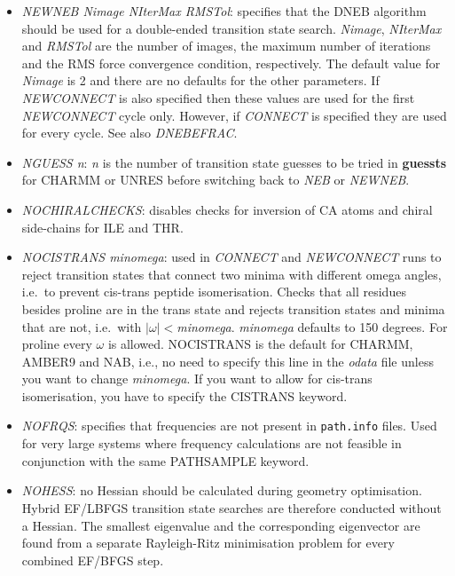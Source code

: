 \documentclass[12pt,a4paper,dvips]{article}
\begin{document}
\begin{itemize}
\item {\it NEWNEB Nimage NIterMax RMSTol\/}:
specifies that the DNEB algorithm\cite{TrygubenkoW04} 
should be used for a double-ended transition state search.
{\it Nimage\/}, {\it NIterMax\/} and {\it RMSTol} are the number of images, the maximum
number of iterations and the RMS force convergence condition, respectively. 
The default value for {\it Nimage\/} is 2 and there are no defaults for the other parameters.
If {\it NEWCONNECT\/} is also specified then these values are used for the first {\it NEWCONNECT\/}
cycle only. However, if {\it CONNECT\/} is specified they are used for every cycle.
See also {\it DNEBEFRAC\/}.

\item {\it NGUESS n\/}: {\it n\/} is the number of transition state guesses to be tried in 
{\bf guessts} for CHARMM or UNRES before switching back to {\it NEB\/} or {\it NEWNEB\/}.

\item {\it NOCHIRALCHECKS\/}: disables checks for inversion of CA atoms and chiral side-chains for ILE and THR.

\item {\it NOCISTRANS minomega\/}: used in {\it CONNECT\/}
and {\it NEWCONNECT} runs to reject transition states
that connect two minima with different omega angles, i.e.~to prevent cis-trans peptide
isomerisation. Checks that all residues besides proline are in the 
trans state and rejects transition states and minima that are not, 
i.e.~with $|\omega|<${\it minomega}. {\it minomega\/} defaults to 150 degrees. 
For proline every $\omega$ is allowed. NOCISTRANS is the default for
CHARMM, AMBER9 and NAB, i.e., no need to specify this line in the {\it odata} file unless you want 
to change {\it minomega\/}. If you want to allow for cis-trans isomerisation, you have to specify 
the CISTRANS keyword.

\item {\it NOFRQS\/}: specifies that frequencies are not present in {\tt path.info} files.
Used for very large systems where frequency calculations are not feasible in conjunction
with the same PATHSAMPLE keyword.

\item {\it NOHESS\/}: no Hessian should be calculated during geometry optimisation.
Hybrid EF/LBFGS transition state searches are therefore conducted without a
Hessian. The smallest eigenvalue and the corresponding eigenvector are found from a separate
Rayleigh-Ritz minimisation problem for every combined EF/BFGS step.


\end{itemize}
\end{document}
